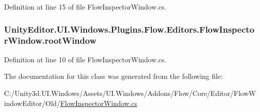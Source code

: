 Definition at line 15 of file Flow\+Inspector\+Window.\+cs.

\hypertarget{class_unity_editor_1_1_u_i_1_1_windows_1_1_plugins_1_1_flow_1_1_editors_1_1_flow_inspector_window_a08f30490ad3c3b71253dee83d6515a36}{}
\subsubsection[{root\+Window}]{ Unity\+Editor.\+U\+I.\+Windows.\+Plugins.\+Flow.\+Editors.\+Flow\+Inspector\+Window.\+root\+Window}\label{class_unity_editor_1_1_u_i_1_1_windows_1_1_plugins_1_1_flow_1_1_editors_1_1_flow_inspector_window_a08f30490ad3c3b71253dee83d6515a36}


Definition at line 10 of file Flow\+Inspector\+Window.\+cs.



The documentation for this class was generated from the following file\+:\begin{DoxyCompactItemize}
\item 
C\+:/\+Unity3d.\+U\+I.\+Windows/\+Assets/\+U\+I.\+Windows/\+Addons/\+Flow/\+Core/\+Editor/\+Flow\+Window\+Editor/\+Old/\hyperlink{_flow_inspector_window_8cs}{Flow\+Inspector\+Window.\+cs}\end{DoxyCompactItemize}
